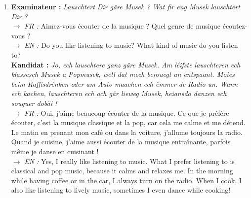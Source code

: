 \begin{enumerate}
    \item \textbf{Examinateur :} \textit{Lauschtert Dir gäre Musek ? Wat fir eng Musek lauschtert Dir ?} \\
    $\rightarrow$ \textit{FR :} Aimez-vous écouter de la musique ? Quel genre de musique écoutez-vous ? \\
    $\rightarrow$ \textit{EN :} Do you like listening to music? What kind of music do you listen to? \\
    \textbf{Kandidat :} \textit{Jo, ech lauschtere ganz gäre Musek. Am léifste lauschteren ech klassesch Musek a Popmusek, well dat mech berouegt an entspaant. Moies beim Kaffisdrénken oder am Auto maachen ech ëmmer de Radio un. Wann ech kachen, lauschteren ech och gär lieweg Musek, heiansdo danzen ech souguer dobäi !} \\
    $\rightarrow$ \textit{FR :} Oui, j'aime beaucoup écouter de la musique. Ce que je préfère écouter, c'est la musique classique et la pop, car cela me calme et me détend. Le matin en prenant mon café ou dans la voiture, j'allume toujours la radio. Quand je cuisine, j'aime aussi écouter de la musique entraînante, parfois même je danse en cuisinant ! \\
    $\rightarrow$ \textit{EN :} Yes, I really like listening to music. What I prefer listening to is classical and pop music, because it calms and relaxes me. In the morning while having coffee or in the car, I always turn on the radio. When I cook, I also like listening to lively music, sometimes I even dance while cooking!
    
    \vspace{0.4em}


\end{enumerate}
